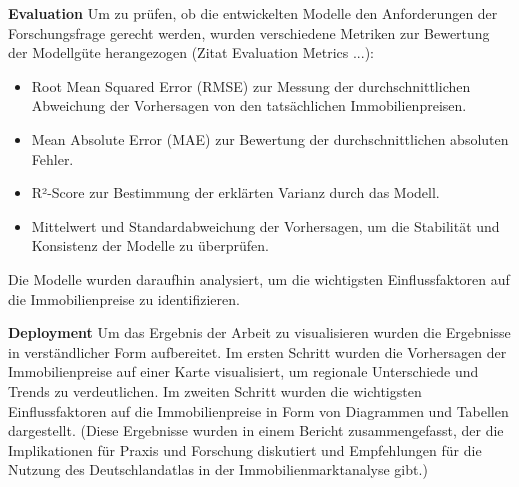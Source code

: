 \textbf{Evaluation}
Um zu prüfen, ob die entwickelten Modelle den Anforderungen der Forschungsfrage gerecht werden, wurden verschiedene Metriken zur Bewertung der Modellgüte herangezogen (Zitat Evaluation Metrics ...):
\begin{itemize}
    \item Root Mean Squared Error (RMSE) zur Messung der durchschnittlichen Abweichung der Vorhersagen von den tatsächlichen Immobilienpreisen.
    \item Mean Absolute Error (MAE) zur Bewertung der durchschnittlichen absoluten Fehler.
    \item R²-Score zur Bestimmung der erklärten Varianz durch das Modell.
    \item Mittelwert und Standardabweichung der Vorhersagen, um die Stabilität und Konsistenz der Modelle zu überprüfen.
\end{itemize}

Die Modelle wurden daraufhin analysiert, um die wichtigsten Einflussfaktoren auf die Immobilienpreise zu identifizieren.

\textbf{Deployment}
Um das Ergebnis der Arbeit zu visualisieren wurden die Ergebnisse in verständlicher Form aufbereitet. Im ersten Schritt wurden die Vorhersagen der Immobilienpreise auf einer Karte visualisiert, um regionale Unterschiede und Trends zu verdeutlichen. Im zweiten Schritt wurden die wichtigsten Einflussfaktoren auf die Immobilienpreise in Form von Diagrammen und Tabellen dargestellt. (Diese Ergebnisse wurden in einem Bericht zusammengefasst, der die Implikationen für Praxis und Forschung diskutiert und Empfehlungen für die Nutzung des Deutschlandatlas in der Immobilienmarktanalyse gibt.)